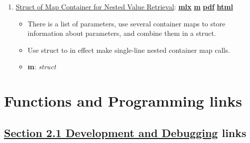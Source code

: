 \documentclass[
]{book}
\providecommand{\tightlist}{%
  \setlength{\itemsep}{0pt}\setlength{\parskip}{0pt}}
\begin{document}
\begin{enumerate}
\def\labelenumi{\arabic{enumi}.}
\tightlist
\item
  \href{https://fanwangecon.github.io/M4Econ/amto/struct/htmlpdfm/fs_struct_map.html}{Struct of Map Container for Nested Value Retrieval}: \href{https://github.com/FanWangEcon/M4Econ/blob/master/amto/struct/fs_struct_map.mlx}{\textbf{mlx}} \textbar{} \href{https://github.com/FanWangEcon/M4Econ/blob/master/amto/struct/htmlpdfm/fs_struct_map.m}{\textbf{m}} \textbar{} \href{https://github.com/FanWangEcon/M4Econ/blob/master/amto/struct/htmlpdfm/fs_struct_map.pdf}{\textbf{pdf}} \textbar{} \href{https://fanwangecon.github.io/M4Econ/amto/struct/htmlpdfm/fs_struct_map.html}{\textbf{html}}

  \begin{itemize}
  \tightlist
  \item
    There is a list of parameters, use several container maps to store information about parameters, and combine them in a struct.
  \item
    Use struct to in effect make single-line nested container map calls.
  \item
    \textbf{m}: \emph{struct}
  \end{itemize}
\end{enumerate}

\hypertarget{functions-and-programming-links}{%
\section{Functions and Programming links}\label{functions-and-programming-links}}

\hypertarget{section-2.1-development-and-debuggingdevelopment-and-debugging-links}{%
\subsection{\texorpdfstring{\protect\hyperlink{development-and-debugging}{Section 2.1 Development and Debugging} links}{Section 2.1 Development and Debugging links}}\label{section-2.1-development-and-debuggingdevelopment-and-debugging-links}}
\end{document}
